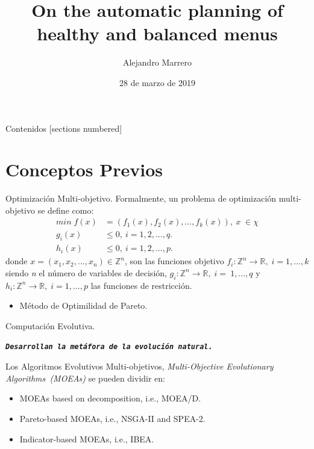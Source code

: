 \documentclass[12pt]{beamer}
\title{On the automatic planning of healthy and balanced menus}
\date{28 de marzo de 2019}
\author{Alejandro Marrero}
\institute{Máster en Ingeniería Informática}
\begin{document}
\maketitle

\begin{frame}{Contenidos}
  [sections numbered]
  \tableofcontents[hideallsubsections]
\end{frame}


\section{Conceptos Previos}

\begin{frame}[fragile]{Optimización Multi-objetivo.}
Formalmente, un problema de optimización multi-objetivo se define como:
\begin{align*}
min\;f(x) & = (f_{1}(x), f_{2}(x), ..., f_{k}(x)), \: x\;\in\chi \\
 g_{i}(x) & \leq 0, \: i = 1, 2, ..., q. \\
 h_{i}(x) & \leq 0, \: i = 1, 2, ..., p.
\end{align*}
donde $x = (x_{1}, x_{2}, ..., x_{n}) \in \mathbb{Z}^{n}$, son las funciones objetivo $f_{i}: \mathbb{Z}^{n} \rightarrow \mathbb{R}, \; i = 1, ..., k$ siendo \textit{n} el número de variables de decisión, $g_{i}: \mathbb{Z}^{n} \rightarrow \mathbb{R}, \; i = ~1, ..., q$ y $h_{i}: \mathbb{Z}^{n} \rightarrow \mathbb{R}, \; i = 1, ..., p$ las funciones de restricción. \\
\begin{itemize}
    \item Método de Optimilidad de Pareto\cite{search, metaheuristics}.
\end{itemize}
\end{frame}

\begin{frame}[fragile]{Computación Evolutiva.}
    \begin{center}
        \texttt{\textbf{\textit{Desarrollan la metáfora de la evolución natural\cite{eiben}.}}}
    \end{center}
    Los Algoritmos Evolutivos Multi-objetivos, \textit{Multi-Objective Evolutionary Algorithms~(MOEAs)} se pueden dividir en:
    \begin{itemize}
        \item MOEAs based on decomposition, i.e., MOEA/D\cite{Zhang2007, Ma2018}.
        \item Pareto-based MOEAs, i.e., NSGA-II\cite{996017} and SPEA-2\cite{Laumanns2001SPEA2}.
        \item Indicator-based MOEAs, i.e., IBEA\cite{IBEA}.
    \end{itemize}
\end{frame}
\end{document}
